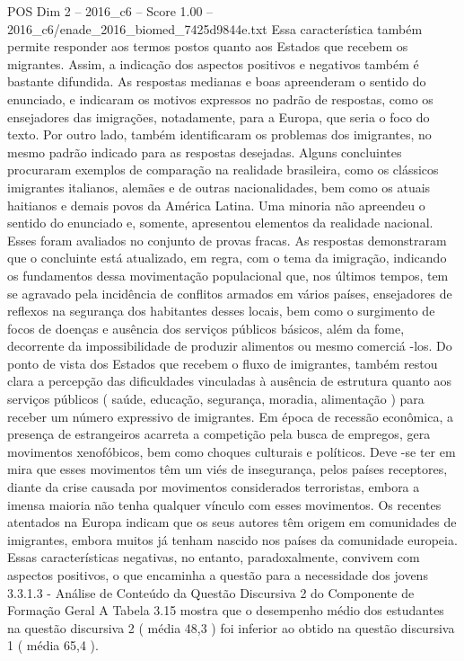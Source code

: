 \begin{textsample}{POS Dim 2 – 2016\_c6 – Score 1.00 – 2016\_c6/enade\_2016\_biomed\_7425d9844e.txt}
Essa característica também permite responder aos termos postos quanto aos Estados que recebem os migrantes.
Assim, a indicação dos aspectos positivos e negativos também é bastante difundida.
As respostas medianas e boas apreenderam o sentido do enunciado, e indicaram os motivos expressos no padrão de respostas, como os ensejadores das imigrações, notadamente, para a Europa, que seria o foco do texto.
Por outro lado, também identificaram os problemas dos imigrantes, no mesmo padrão indicado para as respostas desejadas.
Alguns concluintes procuraram exemplos de comparação na realidade brasileira, como os clássicos imigrantes italianos, alemães e de outras nacionalidades, bem como os atuais haitianos e demais povos da América Latina.
Uma minoria não apreendeu o sentido do enunciado e, somente, apresentou elementos da realidade nacional.
Esses foram avaliados no conjunto de provas fracas.
As respostas demonstraram que o concluinte está atualizado, em regra, com o tema da imigração, indicando os fundamentos dessa movimentação populacional que, nos últimos tempos, tem se agravado pela incidência de conflitos armados em vários países, ensejadores de reflexos na segurança dos habitantes desses locais, bem como o surgimento de focos de doenças e ausência dos serviços públicos básicos, além da fome, decorrente da impossibilidade de produzir alimentos ou mesmo comerciá -los.
Do ponto de vista dos Estados que recebem o fluxo de imigrantes, também restou clara a percepção das dificuldades vinculadas à ausência de estrutura quanto aos serviços públicos ( saúde, educação, segurança, moradia, alimentação ) para receber um número expressivo de imigrantes.
Em época de recessão econômica, a presença de estrangeiros acarreta a competição pela busca de empregos, gera movimentos xenofóbicos, bem como choques culturais e políticos.
Deve -se ter em mira que esses movimentos têm um viés de insegurança, pelos países receptores, diante da crise causada por movimentos considerados terroristas, embora a imensa maioria não tenha qualquer vínculo com esses movimentos.
Os recentes atentados na Europa indicam que os seus autores têm origem em comunidades de imigrantes, embora muitos já tenham nascido nos países da comunidade europeia.
Essas características negativas, no entanto, paradoxalmente, convivem com aspectos positivos, o que encaminha a questão para a necessidade dos jovens 3.3.1.3 - Análise de Conteúdo da Questão Discursiva 2 do Componente de Formação Geral A Tabela 3.15 mostra que o desempenho médio dos estudantes na questão discursiva 2 ( média 48,3 ) foi inferior ao obtido na questão discursiva 1 ( média 65,4 ).

\end{textsample}
